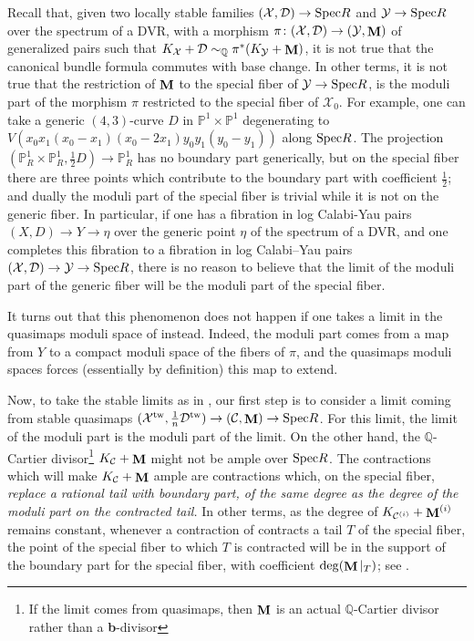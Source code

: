 \documentclass[a4paper,12pt]{amsart}
\DeclareMathOperator{\tw}{tw}
\newcommand{\bQ}{{\mathbb Q}}
\newcommand{\bP}{{\mathbb P}}
\newcommand{\cX}{{\mathcal{X}}}
\newcommand{\cY}{{\mathcal{Y}}}
\DeclareMathOperator{\bfM}{{\bf{M}}}
\newcommand\spec{\text{\rm Spec}}
\newcommand\cD{{\mathcal{D}}}
\newcommand\cC{{\mathcal{C}}}
\theoremstyle{definition}
\theoremstyle{remark}
\begin{document}
Recall that, given two locally stable families $(\cX,\cD)\to \spec R$ and $\cY\to \spec R$ over the spectrum of a DVR, with a morphism $\pi\colon (\cX,\cD)\to (\cY,\bfM)$ of generalized pairs such that $K_\cX+\cD\sim_\bQ\pi^*(K_\cY+\bfM)$, it is not true that the canonical bundle formula commutes with base change. In other terms, it is not true that the restriction of $\bfM$ to the special fiber of $\cY\to\spec R$, is the moduli part of the morphism $\pi$ restricted to the special fiber of $\cX_0$.
For example, one can take a generic $(4,3)$-curve $D$ in $\bP^1\times\bP^1$ degenerating to $V(x_0x_1(x_0-x_1)(x_0-2x_1)y_0y_1(y_0-y_1))$ along $\spec R$. The projection $(\bP^1_R\times \bP^1_R,\frac{1}{2}D)\to \bP^1_R$ has no boundary part generically, but on the special fiber there are three points which contribute to the boundary part with coefficient $\frac{1}{2}$; and dually the moduli part of the special fiber is trivial while it is not on the generic fiber.
In particular, if one has a fibration in log Calabi-Yau pairs $(X,D)\to Y\to \eta$ over the generic point $\eta $ of the spectrum of a DVR, and one completes this fibration to a fibration in log Calabi--Yau pairs $(\cX,\cD)\to \cY\to \spec R$, there is no reason to believe that the limit of the moduli part of the generic fiber will be the moduli part of the special fiber. 

It turns out that this phenomenon does not happen if one takes a limit in the quasimaps moduli space of \cite{twisted_map_2} instead. Indeed, the moduli part comes from a map from $Y$ to a compact moduli space of the fibers of $\pi$, and the quasimaps moduli spaces forces (essentially by definition) this map to extend.

Now, to take the stable limits as in , our first step is to consider a limit coming from stable quasimaps $(\cX^{\tw},\frac{1}{n}\cD^{\tw})\to (\cC,\bfM)\to \spec R$. For this limit, the limit of the moduli part is the moduli part of the limit. On the other hand,
the $\bQ$-Cartier divisor\footnote{If the limit comes from quasimaps, then $\bfM$ is an actual $\bQ$-Cartier divisor rather than a \textbf{b}-divisor} $K_{\cC}+\bfM$ might not be ample over $\spec R$. The contractions which will make $K_{\cC}+\bfM$ ample are contractions which,
on the special fiber, \textit{replace a rational tail with boundary part, of the same degree as the degree of the moduli part on the contracted tail.} In other terms, as the degree of $K_{\cC^{(i)}}+\bfM^{(i)}$ remains constant, whenever a contraction of 
contracts a tail $T$ of the special fiber, the point of the special fiber to which $T$ is contracted will be in the support of the boundary part for the special fiber, with coefficient $\deg(\bfM|_T)$; see .
\end{document}
